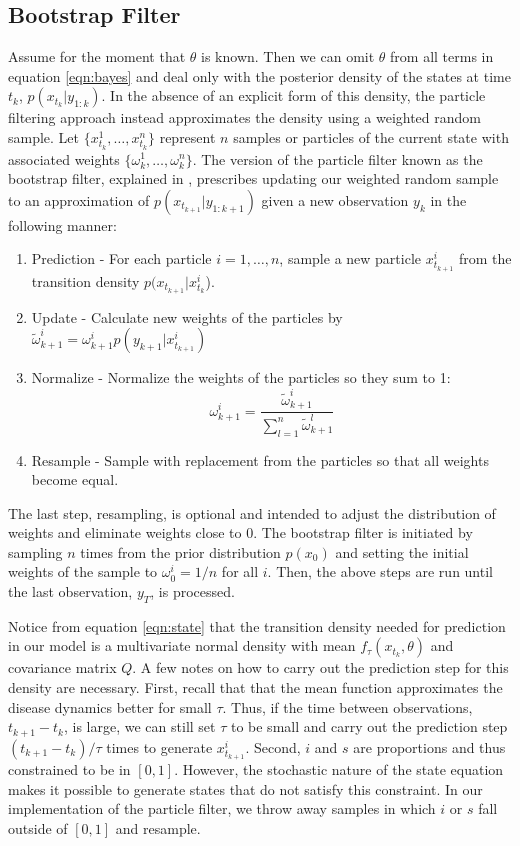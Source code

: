 \documentclass{article}
\begin{document}
\subsection{Bootstrap Filter}

Assume for the moment that $\theta$ is known.  Then we can omit $\theta$ from all terms in equation \eqref{eqn:bayes} and deal only with the posterior density of the states at time $t_k$, $p(x_{t_k}|y_{1:k})$.  In the absence of an explicit form of this density, the particle filtering approach instead approximates the density using a weighted random sample.  Let $\{x_{t_k}^1,\ldots,x_{t_k}^n\}$ represent $n$ samples or particles of the current state with associated weights $\{\omega_k^1,\ldots,\omega_k^n\}$.  The version of the particle filter known as the bootstrap filter, explained in \citep{Gord:Salm:Smit:nove:1993}, prescribes updating our weighted random sample to an approximation of $p(x_{t_{k+1}}|y_{1:k+1})$ given a new observation $y_k$ in the following manner:

\begin{enumerate}
\item Prediction - For each particle $i = {1,\ldots,n}$, sample a new particle $x_{t_{k+1}}^i$ from the transition density $p(x_{t_{k+1}}|x_{t_k}^i$).
\item Update - Calculate new weights of the particles by $\tilde{\omega}_{k+1}^i = \omega_{k+1}^i p(y_{k+1}|x_{t_{k+1}}^i)$
\item Normalize - Normalize the weights of the particles so they sum to 1: \[\omega_{k+1}^i = \frac{\tilde{\omega}_{k+1}^i}{\sum_{l=1}^n \tilde{\omega}_{k+1}^l}\]
\item Resample - Sample with replacement from the particles so that all weights become equal.
\end{enumerate}

\noindent The last step, resampling, is optional and intended to adjust the distribution of weights and eliminate weights close to 0.  The bootstrap filter is initiated by sampling $n$ times from the prior distribution $p(x_0)$ and setting the initial weights of the sample to $\omega_0^i = 1/n$ for all $i$.  Then, the above steps are run until the last observation, $y_T$, is processed.

Notice from equation \eqref{eqn:state} that the transition density needed for prediction in our model is a multivariate normal density with mean $f_\tau(x_{t_k},\theta)$ and covariance matrix $Q$.  A few notes on how to carry out the prediction step for this density are necessary. First, recall that that the mean function approximates the disease dynamics better for small $\tau$.  Thus, if the time between observations, $t_{k+1} - t_k$, is large, we can still set $\tau$ to be small and carry out the prediction step $(t_{k+1} - t_k) / \tau$ times to generate $x_{t_{k+1}}^i$.  Second, $i$ and $s$ are proportions and thus constrained to be in $[0,1]$.  However, the stochastic nature of the state equation makes it possible to generate states that do not satisfy this constraint.  In our implementation of the particle filter, we throw away samples in which $i$ or $s$ fall outside of $[0,1]$ and resample.
\end{document}
